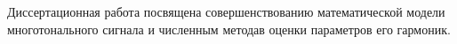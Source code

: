 
{\actuality} 
Диссертационная работа посвящена совершенствованию математической модели многотонального сигнала и численным методав оценки параметров его гармоник. 


%
%
%
%
%
%

